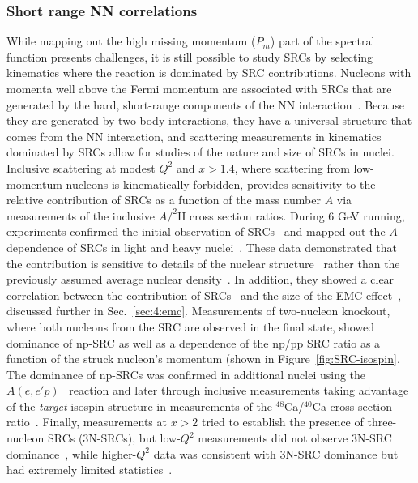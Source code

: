\subsubsection{Short range NN correlations}

While mapping out the high missing momentum ($P_m$) part of the spectral function presents challenges, it is still possible to study SRCs by selecting kinematics where the reaction is dominated by SRC contributions. Nucleons with momenta well above the Fermi momentum are associated with SRCs that are generated by the hard, short-range components of the NN interaction~\cite{Frankfurt:1981mk, Frankfurt:1988nt, Sargsian:2002wc, Arrington:2011xs, Fomin:2017ydn, Arrington:2022sov}. Because they are generated by two-body interactions, they have a universal structure that comes from the NN interaction, and scattering measurements in kinematics dominated by SRCs allow for studies of the nature and size of SRCs in nuclei. Inclusive scattering at modest $Q^2$ and $x>1.4$, where scattering from low-momentum nucleons is kinematically forbidden, provides sensitivity to the relative contribution of SRCs as a function of the mass number  $A$ via measurements of the inclusive $A/^2$H cross section ratios. During 6 GeV running, experiments confirmed the initial observation of SRCs~\cite{Frankfurt:1993sp} and mapped out the $A$ dependence of SRCs in light and heavy nuclei~\cite{CLAS:2003eih, Fomin:2011ng}. These data demonstrated that the contribution is sensitive to details of the nuclear structure~\cite{Seely:2009gt, Arrington:2021vuu} rather than the previously assumed average nuclear density~\cite{Gomez:1993ri}. In addition, they showed a clear correlation between the contribution of SRCs~\cite{Fomin:2011ng} and the size of the EMC effect~\cite{Seely:2009gt}, discussed further in Sec.~\ref{sec:4:emc}. Measurements of two-nucleon knockout, where both nucleons from the SRC are observed in the final state, showed dominance of np-SRC as well as a dependence of the np/pp SRC ratio as a function of the struck nucleon's momentum (shown in Figure~\ref{fig:SRC-isospin}. The dominance of np-SRCs was confirmed in additional nuclei using the  $A(e,e'p)$~\cite{CLAS:2018yvt} reaction and later through inclusive measurements taking advantage of the \textit{target} isospin structure in measurements of the $^{48}$Ca/$^{40}$Ca cross section ratio~\cite{JeffersonLabHallA:2020wrr}. Finally, measurements at $x>2$ tried to establish the presence of three-nucleon SRCs (3N-SRCs), but low-$Q^2$ measurements did not observe 3N-SRC dominance~\cite{HallA:2017ivm}, while higher-$Q^2$ data was consistent with 3N-SRC dominance but had extremely limited statistics~\cite{Fomin:2011ng}. 

